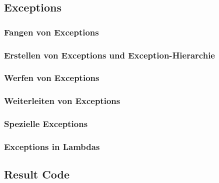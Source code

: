 
\subsection{Exceptions}
	
	\subsubsection{Fangen von Exceptions}
	
	\subsubsection{Erstellen von Exceptions und Exception-Hierarchie}
	
	\subsubsection{Werfen von Exceptions}
	
	\subsubsection{Weiterleiten von Exceptions}
	
	\subsubsection{Spezielle Exceptions}
	
	\subsubsection{Exceptions in Lambdas}

\subsection{Result Code}
